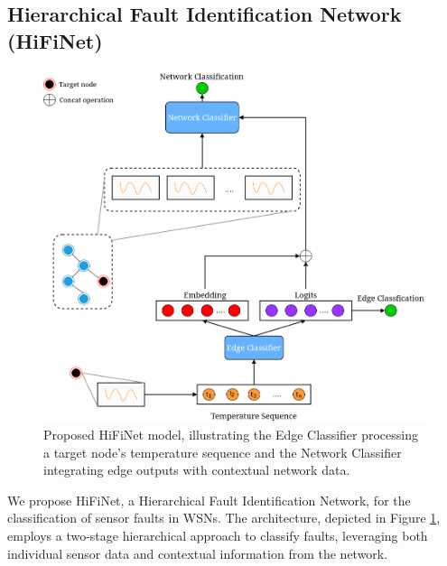 \subsection{Hierarchical Fault Identification Network (HiFiNet)}
\begin{figure}
  \centering
  \includegraphics[width=0.65\linewidth]{images/HiFiNet.png}
  \caption{Proposed HiFiNet model, illustrating the Edge Classifier processing a target node's temperature sequence and the Network Classifier integrating edge outputs with contextual network data.}
  \label{fig:hifinet}
\end{figure}
We propose HiFiNet, a Hierarchical Fault Identification Network, for the classification of sensor faults in WSNs. The architecture, depicted in Figure \ref{fig:hifinet}, employs a two-stage hierarchical approach to classify faults, leveraging both individual sensor data and contextual information from the network.

